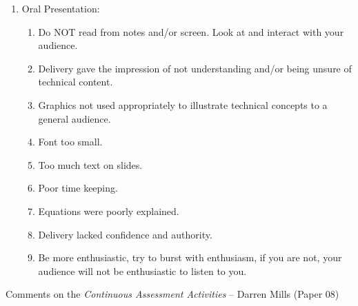 \documentclass[14pt,twoside]{report}
\begin{document}
\begin{enumerate}
\item Oral Presentation:
\begin{enumerate}
%
\item Do NOT read from notes and/or screen. Look at and interact with your audience.
%
\item Delivery gave the impression of not understanding and/or being unsure of technical content.
%
\item Graphics not used appropriately to illustrate technical concepts to a general audience. 
%
\item Font too small. 
%
\item Too much text on slides.
%
\item Poor time keeping.
%
\item Equations were poorly explained.
%
\item Delivery lacked confidence and authority.
%
\item Be more enthusiastic, try to burst with enthusiasm, if you are not, your audience will not be enthusiastic to listen to you.
%
\end{enumerate}

\end{enumerate}


\clearpage







\bigskip

\begin{center}
  {\Large Comments on the {\it Continuous Assessment Activities} -- Darren Mills (Paper 08)}
\end{center}
\end{document}
